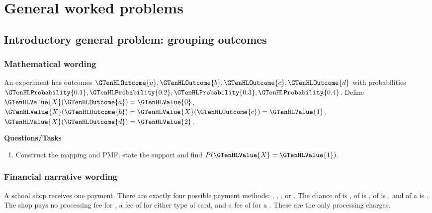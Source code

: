 \section{General worked problems}


\subsection{Introductory general problem: grouping outcomes}
\label{subsec:t2-c1-introductory-general-problem-grouping-outcomes}
\subsubsection*{Mathematical wording}
An experiment has outcomes $\GTenHLOutcome{a},\GTenHLOutcome{b},\GTenHLOutcome{c},\GTenHLOutcome{d}$ with probabilities $\GTenHLProbability{0.1},\GTenHLProbability{0.2},\GTenHLProbability{0.3},\GTenHLProbability{0.4}$. Define $\GTenHLValue{X}(\GTenHLOutcome{a})=\GTenHLValue{0}$, $\GTenHLValue{X}(\GTenHLOutcome{b})=\GTenHLValue{X}(\GTenHLOutcome{c})=\GTenHLValue{1}$, $\GTenHLValue{X}(\GTenHLOutcome{d})=\GTenHLValue{2}$.

\textbf{Questions/Tasks}
\begin{enumerate}
\item Construct the mapping and PMF; state the support and find $P(\GTenHLValue{X}=\GTenHLValue{1})$.
\end{enumerate}
\subsubsection*{Financial narrative wording}
A school shop receives one payment. There are exactly four possible payment methods: , , , or . The chance of  is , of  is , of  is , and of a  is . The shop pays no processing fee for , a fee of  for either type of card, and a fee of  for a . These are the only processing charges.

